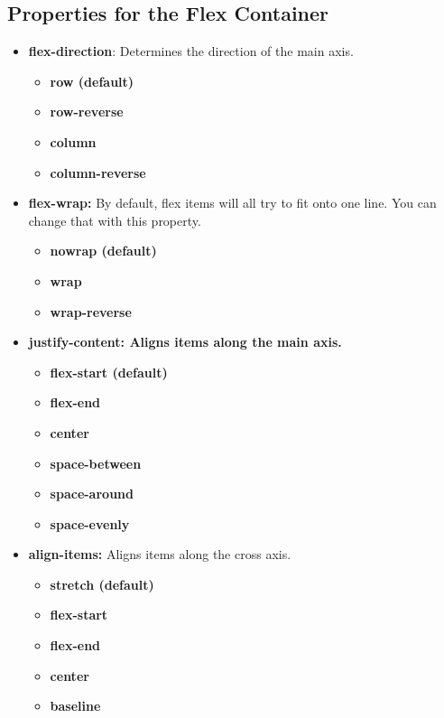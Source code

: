 \documentclass{report}
\begin{document}
    \subsection{Properties for the Flex Container}
    \bigbreak \noindent 
    \begin{itemize}
    \item \textbf{flex-direction}: Determines the direction of the main axis.
        \begin{itemize}
            \item \textbf{row (default)}
            \item \textbf{row-reverse}
            \item \textbf{column}
            \item \textbf{column-reverse}
    \end{itemize}
    \item \textbf{flex-wrap:} By default, flex items will all try to fit onto one line. You can change that with this property.
        \begin{itemize}
            \item \textbf{nowrap (default)}
            \item \textbf{wrap}
            \item \textbf{wrap-reverse}
        \end{itemize}
    \item \textbf{justify-content: Aligns items along the main axis.}
    \begin{itemize}
        \item \textbf{flex-start (default)}
        \item \textbf{flex-end}
        \item \textbf{center}
        \item \textbf{space-between}
        \item \textbf{space-around}
        \item \textbf{space-evenly}
    \end{itemize}
    \item \textbf{align-items:} Aligns items along the cross axis.
    \begin{itemize}
        \item \textbf{stretch (default)}
        \item \textbf{flex-start}
        \item \textbf{flex-end}
        \item \textbf{center}
        \item \textbf{baseline}
    \end{itemize}


\end{itemize}
\end{document}
